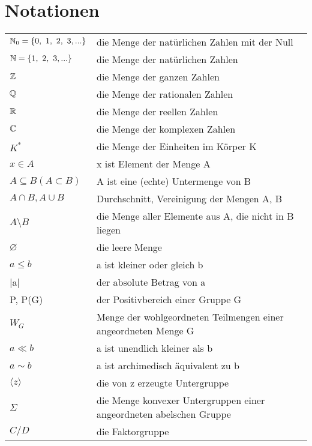 \chapter{Notationen}

\begin{center}
\begin{tabular}{ll}
  $\mathbb{N}_0 = \lbrace 0,~1,~2,~3,...\rbrace$ & die Menge der natürlichen Zahlen mit der Null	\\
  $\mathbb{N} = \lbrace 1,~2,~3,...\rbrace$ & die Menge der natürlichen Zahlen \\
  $\mathbb{Z}$ & die Menge der ganzen Zahlen\\
  $\mathbb{Q}$ & die Menge der rationalen Zahlen\\
  $\mathbb{R}$ & die Menge der reellen Zahlen\\
  $\mathbb{C}$ & die Menge der komplexen Zahlen\\
  $K^*$& die Menge der Einheiten im Körper K\\
  $x \in A$ & x ist Element der Menge A\\
  $A\subseteq B (A \subset B)$& A ist eine (echte) Untermenge von B \\
  $A \cap B, A \cup B$ & Durchschnitt, Vereinigung der Mengen A, B\\
  $A \setminus B$ & die Menge aller Elemente aus A, die nicht in B liegen \\
  $\varnothing$ & die leere Menge \\
  $ a \leq b$ & a ist kleiner oder gleich b\\
  |a| & der absolute Betrag von a\\
  P, P(G) & der Positivbereich einer Gruppe G \\
  $W_G$ & Menge der wohlgeordneten Teilmengen einer angeordneten Menge G\\
  $a \ll b$ & a ist unendlich kleiner als b\\
  $a \sim b$ & a ist archimedisch äquivalent zu b\\
  $\langle z \rangle$ & die von z erzeugte Untergruppe\\
  $\Sigma$ & die Menge konvexer Untergruppen einer angeordneten abelschen Gruppe\\
  $C/D$ & die Faktorgruppe\\
 \end{tabular}
\end{center}
